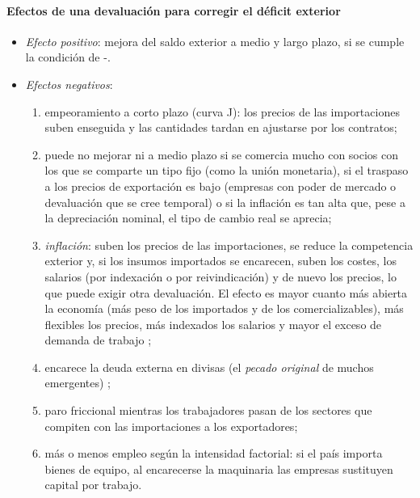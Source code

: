 \documentclass[11pt]{article}
\begin{document}
\paragraph{Efectos de una devaluación para corregir el déficit exterior}
\begin{itemize}
\item \emph{Efecto positivo}: mejora del saldo exterior a medio y largo plazo, si se cumple la condición de -.
\item \emph{Efectos negativos}:
  \begin{enumerate}
  \item empeoramiento a corto plazo (curva J): los precios de las importaciones suben enseguida y las cantidades tardan en ajustarse por los contratos;
  \item puede no mejorar ni a medio plazo si se comercia mucho con socios con los que se comparte un tipo fijo (como la unión monetaria), si el traspaso a los precios de exportación es bajo (empresas con poder de mercado o devaluación que se cree temporal) o si la inflación es tan alta que, pese a la depreciación nominal, el tipo de cambio real se aprecia;
  \item \emph{inflación}: suben los precios de las importaciones, se reduce la competencia exterior y, si los insumos importados se encarecen, suben los costes, los salarios (por indexación o por reivindicación) y de nuevo los precios, lo que puede exigir otra devaluación. El efecto es mayor cuanto más abierta la economía (más peso de los importados y de los comercializables), más flexibles los precios, más indexados los salarios y mayor el exceso de demanda de trabajo \parencite{KrugmanObstfeldMelitz2018,CampaGoldberg2005};
  \item encarece la deuda externa en divisas (el \emph{pecado original} de muchos emergentes) \parencite{EHP2005PecadoOriginal};
  \item paro friccional mientras los trabajadores pasan de los sectores que compiten con las importaciones a los exportadores;
  \item más o menos empleo según la intensidad factorial: si el país importa bienes de equipo, al encarecerse la maquinaria las empresas sustituyen capital por trabajo.
  \end{enumerate}
\end{itemize}

\begin{infografia}[!htb]
\centering
\caption{Efectos de una devaluación para corregir el déficit exterior}\label{figu:esquema-devaluacion}
\end{infografia}
\end{document}
